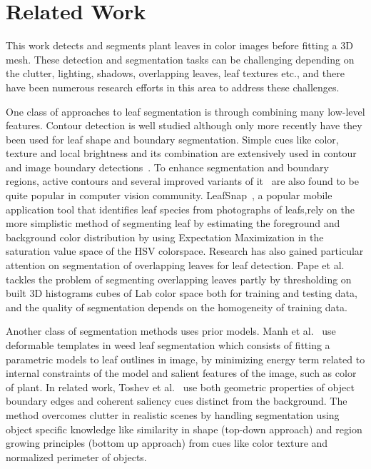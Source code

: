 \section{Related Work}
\label{sec:related}




This work detects and segments plant leaves in color images before fitting a $3$D mesh.  These detection and segmentation tasks can be challenging depending on the clutter, lighting, shadows, overlapping leaves, leaf textures etc., and there have been numerous research efforts in this area to address these challenges.

One class of approaches to leaf segmentation is through combining many low-level features.  Contour detection is well studied although only more recently have they been used for leaf shape and boundary segmentation.  Simple cues like color, texture and local brightness and its combination are extensively used in contour and image boundary detections~\cite{martin2004learning,valliammal2012leaf}. To enhance segmentation and boundary regions, active contours and several improved variants of it~\cite{mishra2011decoupled} are also found to be quite popular in computer vision community. LeafSnap~\cite{kumar2012leafsnap}, a popular mobile application tool that identifies leaf species from photographs of leafs,rely on the more simplistic method of segmenting leaf by estimating the foreground and background color distribution by using Expectation Maximization in the saturation value space of the HSV colorspace. Research has also gained particular attention on segmentation of overlapping leaves for leaf detection. Pape et al.~\cite{Pape2015} tackles the problem of segmenting overlapping leaves partly by thresholding on built 3D histograms cubes of Lab color space both for training and testing data, and the quality of segmentation depends on the homogeneity of training data.

Another class of segmentation methods uses prior models.  Manh et al.~\cite{Manh2001139} use deformable templates in weed leaf segmentation which consists of fitting a parametric models to leaf outlines in image, by minimizing energy term related to internal constraints of the model and salient features of the image, such as color of plant. In related work, Toshev et al.~\cite{toshev2012shape} use both geometric properties of object boundary edges and coherent saliency cues distinct from the background. The method overcomes clutter in realistic scenes by handling segmentation using object specific knowledge like similarity in shape (top-down approach) and region growing principles (bottom up approach) from cues like color texture and normalized perimeter of objects.  

